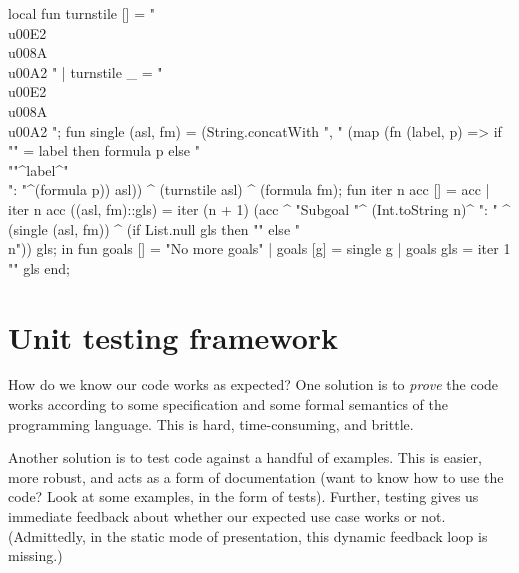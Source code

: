 \nwenddocs{}\endmoddef\nwstartdeflinemarkup{}\nwenddeflinemarkup
local
  fun turnstile [] = "\\u00E2\\u008A\\u00A2 "
    | turnstile _ = " \\u00E2\\u008A\\u00A2 ";
  fun single (asl, fm) =
    (String.concatWith
       ", "
       (map (fn (label, p) =>
                if "" = label then formula p
                else "\\""^label^"\\": "^(formula p))
            asl)) ^
    (turnstile asl) ^ 
    (formula fm);
  fun iter n acc [] = acc
    | iter n acc ((asl, fm)::gls) =
        iter (n + 1)
             (acc ^
              "Subgoal "^
              (Int.toString n)^
              ": " ^
              (single (asl, fm)) ^
              (if List.null gls then "" else "\\n"))
             gls;
in
fun goals [] = "No more goals"
  | goals [g] = single g
  | goals gls = iter 1 "" gls
end;
\eatline

\nwendcode{}%

\section{Unit testing framework}

\begin{node}
How do we know our code works as expected? One solution is to
\emph{prove} the code works according to some specification and some
formal semantics of the programming language. This is hard,
time-consuming, and brittle.

Another solution is to test code against a handful of
examples. This is easier, more robust, and acts as a form of
documentation (want to know how to use the code? Look at some
examples, in the form of tests). Further, testing gives us immediate
feedback about whether our expected use case works or
not. (Admittedly, in the static mode of presentation, this dynamic
feedback loop is missing.)
\end{node}

